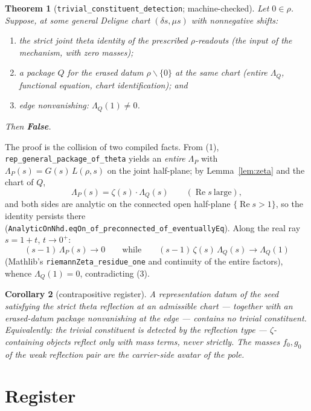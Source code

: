 \documentclass[11pt]{article}
\newtheorem{theorem}{Theorem}
\newtheorem{corollary}[theorem]{Corollary}
\begin{document}
\begin{theorem}[\texttt{trivial\_constituent\_detection}; machine-checked]
\label{thm:detect}
Let $0\in\rho$.  Suppose, at some general Deligne chart $(\delta s,\mu s)$ with
nonnegative shifts:
\begin{enumerate}
\item the \emph{strict} joint theta identity of the prescribed $\rho$-readouts
(the input of the mechanism, with zero masses);
\item a package $Q$ for the erased datum $\rho\smallsetminus\{0\}$ at the same chart
(entire $\Lambda_Q$, functional equation, chart identification); and
\item edge nonvanishing: $\Lambda_Q(1)\neq0$.
\end{enumerate}
Then \textbf{False}.
\end{theorem}

The proof is the collision of two compiled facts.  From (1),
\texttt{rep\_general\_package\_of\_theta} yields an \emph{entire} $\Lambda_P$ with
$\Lambda_P(s)=G(s)\,L(\rho,s)$ on the joint half-plane; by Lemma~\ref{lem:zeta} and
the chart of $Q$,
\[
\Lambda_P(s)=\zeta(s)\cdot\Lambda_Q(s)
\qquad(\operatorname{Re}s\ \text{large}),
\]
and both sides are analytic on the connected open half-plane
$\{\operatorname{Re}s>1\}$, so the identity persists there
(\texttt{AnalyticOnNhd.eqOn\_of\_preconnected\_of\_eventuallyEq}).  Along the real
ray $s=1+t$, $t\to0^+$:
\[
(s-1)\,\Lambda_P(s)\longrightarrow 0
\qquad\text{while}\qquad
(s-1)\,\zeta(s)\,\Lambda_Q(s)\longrightarrow \Lambda_Q(1)
\]
(Mathlib's \texttt{riemannZeta\_residue\_one} and continuity of the entire factors),
whence $\Lambda_Q(1)=0$, contradicting (3).

\begin{corollary}[contrapositive register]
A representation datum of the seed satisfying the strict theta reflection at an
admissible chart --- together with an erased-datum package nonvanishing at the edge
--- contains no trivial constituent.  Equivalently: the trivial constituent is
\emph{detected by the reflection type} --- $\zeta$-containing objects reflect only
with mass terms, never strictly.  The masses $f_0,g_0$ of the weak reflection pair
are the carrier-side avatar of the pole.
\end{corollary}

\section{Register}
\end{document}
